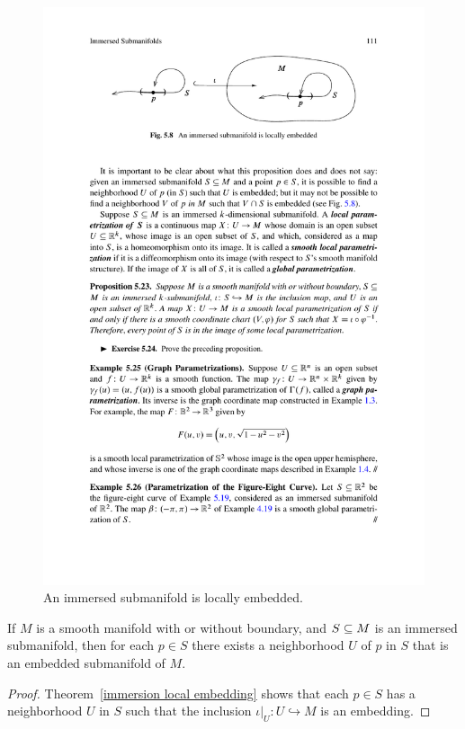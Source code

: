 \begin{figure}[h]
\centering
\includegraphics{pictures/immersered-mani}
\caption{An immersed submanifold is locally embedded.}
\end{figure}
\begin{theorem}\label{immerse local embedd}
If $M$ is a smooth manifold with or without boundary, and $S\subseteq M$ is an immersed submanifold, then for each $p\in S$ there exists a neighborhood $U$ of $p$ in $S$ that is an embedded submanifold of $M$.
\end{theorem}
\begin{proof}
Theorem~\ref{immersion local embedding} shows that each $p\in S$ has a neighborhood $U$ in $S$ such that the inclusion $\iota|_U:U\hookrightarrow M$ is an embedding.
\end{proof}

